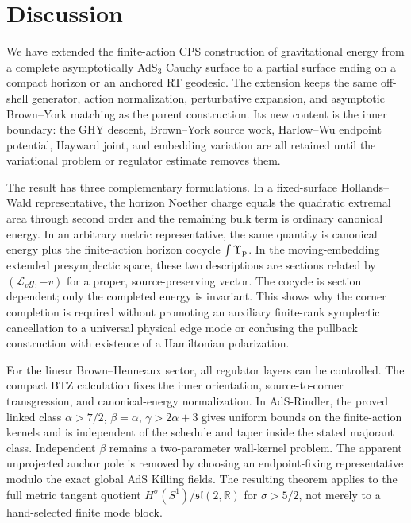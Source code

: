 \section{Discussion}\label{sec:discussion}

We have extended the finite-action CPS construction of gravitational energy from a complete asymptotically AdS$_3$ Cauchy surface to a partial surface ending on a compact horizon or an anchored RT geodesic. The extension keeps the same off-shell generator, action normalization, perturbative expansion, and asymptotic Brown--York matching as the parent construction. Its new content is the inner boundary: the GHY descent, Brown--York source work, Harlow--Wu endpoint potential, Hayward joint, and embedding variation are all retained until the variational problem or regulator estimate removes them.

The result has three complementary formulations. In a fixed-surface Hollands--Wald representative, the horizon Noether charge equals the quadratic extremal area through second order and the remaining bulk term is ordinary canonical energy. In an arbitrary metric representative, the same quantity is canonical energy plus the finite-action horizon cocycle $\int\Upsilon_{\rm p}$. In the moving-embedding extended presymplectic space, these two descriptions are sections related by $(\mathcal L_vg,-v)$ for a proper, source-preserving vector. The cocycle is section dependent; only the completed energy is invariant. This shows why the corner completion is required without promoting an auxiliary finite-rank symplectic cancellation to a universal physical edge mode or confusing the pullback construction with existence of a Hamiltonian polarization.

For the linear Brown--Henneaux sector, all regulator layers can be controlled. The compact BTZ calculation fixes the inner orientation, source-to-corner transgression, and canonical-energy normalization. In AdS-Rindler, the proved linked class $\alpha>7/2$, $\beta=\alpha$, $\gamma>2\alpha+3$ gives uniform bounds on the finite-action kernels and is independent of the schedule and taper inside the stated majorant class. Independent $\beta$ remains a two-parameter wall-kernel problem. The apparent unprojected anchor pole is removed by choosing an endpoint-fixing representative modulo the exact global AdS Killing fields. The resulting theorem applies to the full metric tangent quotient $H^\sigma(S^1)/\mathfrak{sl}(2,\mathbb R)$ for $\sigma>5/2$, not merely to a hand-selected finite mode block.

